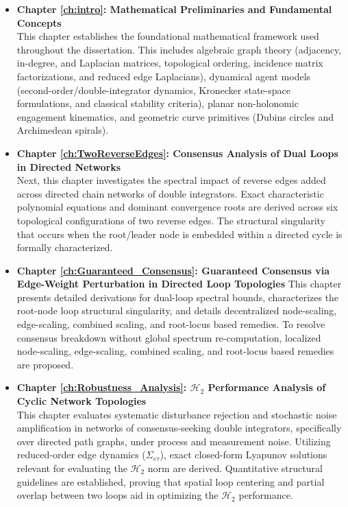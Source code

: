 \begin{itemize}
    \item \textbf{Chapter \ref{ch:intro}: Mathematical Preliminaries and Fundamental Concepts} \\
    This chapter establishes the foundational mathematical framework used throughout the dissertation. This includes algebraic graph theory (adjacency, in-degree, and Laplacian matrices, topological ordering, incidence matrix factorizations, and reduced edge Laplacians), dynamical agent models (second-order/double-integrator dynamics, Kronecker state-space formulations, and classical stability criteria), planar non-holonomic engagement kinematics, and geometric curve primitives (Dubins circles and Archimedean spirals).
    
    \item \textbf{Chapter \ref{ch:TwoReverseEdges}: Consensus Analysis of Dual Loops in Directed Networks } \\
    Next, this chapter investigates the spectral impact of reverse edges added across directed chain networks of double integrators. Exact characteristic polynomial equations and dominant convergence roots are derived across six topological configurations of two reverse edges. The structural singularity that occurs when the root/leader node is embedded within a directed cycle is formally characterized.
    \item \textbf{Chapter \ref{ch:Guaranteed_Consensus}: Guaranteed Consensus via Edge-Weight Perturbation in Directed Loop Topologies}
    This chapter presents detailed derivations for dual-loop spectral bounds, characterizes the root-node loop structural singularity, and details decentralized node-scaling, edge-scaling, combined scaling, and root-locus based remedies. To resolve consensus breakdown without global spectrum re-computation, localized node-scaling, edge-scaling, combined scaling, and root-locus based remedies are proposed.
    \item \textbf{Chapter \ref{ch:Robustness_Analysis}: $\mathcal{H}_2$ Performance Analysis of Cyclic Network Topologies} \\
    This chapter evaluates systematic disturbance rejection and stochastic noise amplification in networks of consensus-seeking double integrators, specifically over directed path graphs, under process and measurement noise. Utilizing reduced-order edge dynamics ($\Sigma_{e\tau}$), exact closed-form Lyapunov solutions relevant for evaluating the $\mathcal{H}_2$ norm are derived. Quantitative structural guidelines are established, proving that spatial loop centering and partial overlap between two loops aid in optimizing the $\mathcal{H}_2$ performance.
    

\end{itemize}

